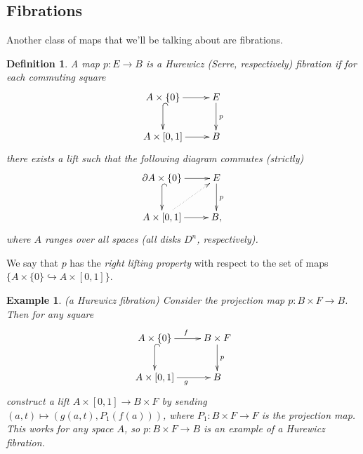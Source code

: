 \documentclass{article}
\newtheorem{definition}[theorem]{Definition}
\newtheorem{example}[theorem]{Example}
\newtheorem{proposed work}[theorem]{Proposed Work}
\newcommand{\xymat}[1]{\begin{align*}\xymatrix{ #1}\end{align*}}
\begin{document}
\subsection{Fibrations}
Another class of maps that we'll be talking about are fibrations.
\begin{definition}
A map $p:E\to B$ is a Hurewicz (Serre, respectively) fibration if for each commuting square
\xymat{A\times \lbrace 0\rbrace \ar[r] \ar@{^{(}->}[d] & E \ar[d]^p \\ A\times [0,1] \ar[r] & B} 
there exists a lift such that the following diagram commutes (strictly)
\xymat{\partial A\times \lbrace 0\rbrace \ar[r] \ar@{^{(}->}[d] & E \ar[d]^p \\ A\times [0,1] \ar[r]\ar@{.>}[ur] & B,}
where $A$ ranges over all spaces (all disks $D^n$, respectively).
\end{definition}
We say that $p$ has the \textit{right lifting property} with respect to the set of maps $\lbrace A\times \lbrace 0\rbrace\hookrightarrow A\times [0,1]\rbrace$.

\begin{example}(a Hurewicz fibration) Consider the projection map $p: B\times F\to B$. Then for any square
\xymat{A\times \lbrace 0\rbrace \ar[r]^f \ar@{^{(}->}[d] & B\times F \ar[d]^p \\ A\times [0,1] \ar[r]_g & B}
construct a lift $A \times [0,1] \to B \times F$ by sending $(a,t)\mapsto (g(a,t), P_1(f(a)))$, where $P_1: B\times F\to F$ is the projection map. This works for any space $A$, so $p : B\times F\to B$ is an example of a Hurewicz fibration. 
\end{example}
\end{document}
